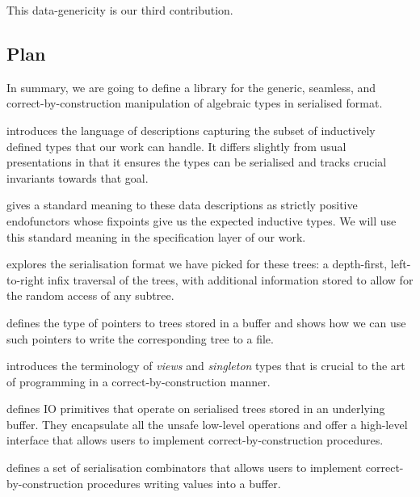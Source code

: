 
This data-genericity is our third contribution.

\subsection{Plan}

In summary, we are going to define a library for the
generic,
seamless,
and correct-by-construction
manipulation of algebraic types in serialised format.


 introduces the language of descriptions capturing the
subset of inductively defined types that our work can handle.
It differs slightly from usual presentations in that it ensures the
types can be serialised and tracks crucial invariants towards that goal.

 gives a standard meaning to these data descriptions
as strictly positive endofunctors whose fixpoints give us the expected
inductive types.
%
We will use this standard meaning in the specification layer of our work.

 explores the serialisation format we have picked
for these trees: a depth-first, left-to-right infix traversal of the
trees, with additional information stored to allow for the random access
of any subtree.

 defines the type of pointers to trees stored in a
buffer and shows how we can use such pointers to write the corresponding
tree to a file.

 introduces the terminology of \emph{views} and
\emph{singleton} types that is crucial to the art of programming
in a correct-by-construction manner.

 defines IO primitives that operate on serialised
trees stored in an underlying buffer.
%
They encapsulate all the unsafe low-level operations and offer a
high-level interface that allows users to implement correct-by-construction
procedures.

 defines a set of serialisation combinators that
allows users to implement correct-by-construction procedures writing
values into a buffer.

